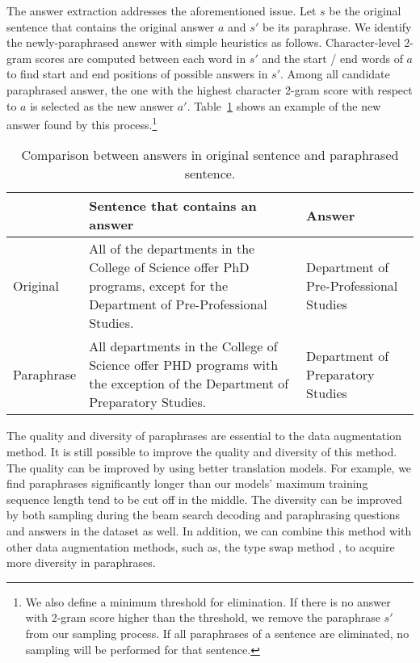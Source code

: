 \documentclass{article} \usepackage{iclr2018_conference,times}
\begin{document}
The answer extraction addresses the aforementioned issue.
Let $s$ be the original sentence that contains the original answer $a$ and $s'$ be its paraphrase. We identify the newly-paraphrased answer with simple heuristics as follows. Character-level 2-gram scores are computed between each word in $s'$ and the start / end words of $a$ to find start and end positions of possible answers in $s'$.
Among all candidate paraphrased answer, the one with the highest character 2-gram score with respect to $a$ is selected as the new answer $a'$. Table~\ref{table:augmentation_answer} shows an example of the new answer found by this process.\footnote{We also define a minimum threshold for elimination. If there is no answer with 2-gram score higher than the threshold, we remove the paraphrase $s'$ from our sampling process. If all paraphrases of a sentence are eliminated, no sampling will be performed for that sentence.}

\begin{table}[ht]
\small
\begin{center}
\begin{tabular}{l|p{7.5cm}|p{3.5cm}}
\hline
&Sentence that contains an answer & Answer \\\hline
Original& All of the departments in the College of Science offer PhD programs, except for the Department of Pre-Professional Studies.  & Department of Pre-Professional Studies\\\hline
Paraphrase& All departments in the College of Science offer PHD programs with the exception of the Department of Preparatory Studies. & Department of Preparatory Studies 
\\\hline
\end{tabular}
\end{center}
\caption{Comparison between answers in original sentence and paraphrased sentence.}
\label{table:augmentation_answer}
\end{table}

The quality and diversity of paraphrases are essential to the data augmentation method. It is still possible to improve the quality and diversity of this method. The quality can be improved by using better translation models. For example, we find paraphrases significantly longer than our models' maximum training sequence length tend to be cut off in the middle. The diversity can be improved by both sampling during the beam search decoding and paraphrasing questions and answers in the dataset as well. In addition, we can combine this method with other data augmentation methods, such as, the type swap method \citep{RaimanM17}, to acquire more diversity in paraphrases.
\end{document}
